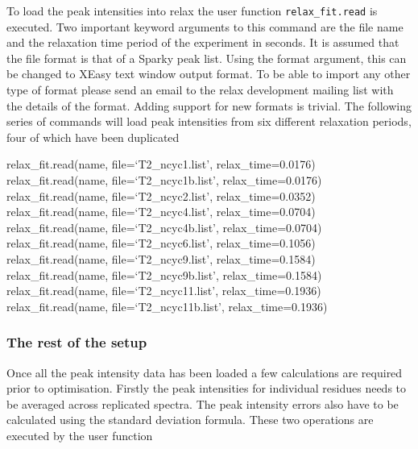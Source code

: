 
To load the peak intensities into relax the user function \texttt{relax\_fit.read} is executed.  Two important keyword arguments to this command are the file name and the relaxation time period of the experiment in seconds.  It is assumed that the file format is that of a Sparky peak list.  Using the format argument, this can be changed to XEasy text window output format.  To be able to import any other type of format please send an email to the relax development mailing list with the details of the format.  Adding support for new formats is trivial.  The following series of commands will load peak intensities from six different relaxation periods, four of which have been duplicated

\begin{exampleenv}
relax\_fit.read(name, file=`T2\_ncyc1.list', relax\_time=0.0176) \\
relax\_fit.read(name, file=`T2\_ncyc1b.list', relax\_time=0.0176) \\
relax\_fit.read(name, file=`T2\_ncyc2.list', relax\_time=0.0352) \\
relax\_fit.read(name, file=`T2\_ncyc4.list', relax\_time=0.0704) \\
relax\_fit.read(name, file=`T2\_ncyc4b.list', relax\_time=0.0704) \\
relax\_fit.read(name, file=`T2\_ncyc6.list', relax\_time=0.1056) \\
relax\_fit.read(name, file=`T2\_ncyc9.list', relax\_time=0.1584) \\
relax\_fit.read(name, file=`T2\_ncyc9b.list', relax\_time=0.1584) \\
relax\_fit.read(name, file=`T2\_ncyc11.list', relax\_time=0.1936) \\
relax\_fit.read(name, file=`T2\_ncyc11b.list', relax\_time=0.1936)
\end{exampleenv}


\subsubsection{The rest of the setup}

Once all the peak intensity data has been loaded a few calculations are required prior to optimisation.  Firstly the peak intensities for individual residues needs to be averaged across replicated spectra.  The peak intensity errors also have to be calculated using the standard deviation formula.  These two operations are executed by the user function

